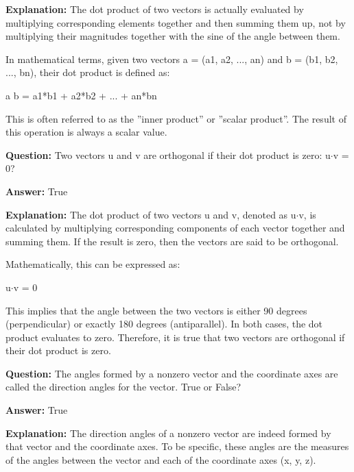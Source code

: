 \documentclass{article}
\begin{document}
                \textbf{Explanation:} The dot product of two vectors is actually evaluated by multiplying corresponding elements together and then summing them up, not by multiplying their magnitudes together with the sine of the angle between them. 

In mathematical terms, given two vectors a = (a1, a2, ..., an) and b = (b1, b2, ..., bn), their dot product is defined as:

a {\textperiodcentered} b = a1*b1 + a2*b2 + ... + an*bn

This is often referred to as the ''inner product'' or ''scalar product''. The result of this operation is always a scalar value.
                
                \vspace{0.5cm} 
        
            
                \textbf {Question:} Two vectors u and v are orthogonal if their dot product is zero: u\ensuremath{\cdot}v = 0?
                
                \textbf{Answer:} True

                \textbf{Explanation:} The dot product of two vectors u and v, denoted as u\ensuremath{\cdot}v, is calculated by multiplying corresponding components of each vector together and summing them. If the result is zero, then the vectors are said to be orthogonal.

Mathematically, this can be expressed as:

u\ensuremath{\cdot}v = 0

This implies that the angle between the two vectors is either 90 degrees (perpendicular) or exactly 180 degrees (antiparallel). In both cases, the dot product evaluates to zero. Therefore, it is true that two vectors are orthogonal if their dot product is zero.
                
                \vspace{0.5cm} 
        
            
                \textbf {Question:} The angles formed by a nonzero vector and the coordinate axes are called the direction angles for the vector. True or False?
                
                \textbf{Answer:} True

                \textbf{Explanation:} The direction angles of a nonzero vector are indeed formed by that vector and the coordinate axes. To be specific, these angles are the measures of the angles between the vector and each of the coordinate axes (x, y, z). 
\end{document}
